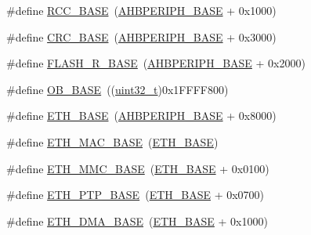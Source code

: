 \begin{DoxyCompactItemize}
\#define \hyperlink{group___peripheral__memory__map_ga0e681b03f364532055d88f63fec0d99d}{R\+C\+C\+\_\+\+B\+A\+SE}~(\hyperlink{openmotestm_2library_2inc_2stm32f10x__map_8h_a92eb5d49730765d2abd0f5b09548f9f5}{A\+H\+B\+P\+E\+R\+I\+P\+H\+\_\+\+B\+A\+SE} + 0x1000)
\item 
\#define \hyperlink{group___peripheral__memory__map_ga656a447589e785594cbf2f45c835ad7e}{C\+R\+C\+\_\+\+B\+A\+SE}~(\hyperlink{openmotestm_2library_2inc_2stm32f10x__map_8h_a92eb5d49730765d2abd0f5b09548f9f5}{A\+H\+B\+P\+E\+R\+I\+P\+H\+\_\+\+B\+A\+SE} + 0x3000)
\item 
\#define \hyperlink{group___peripheral__memory__map_ga8e21f4845015730c5731763169ec0e9b}{F\+L\+A\+S\+H\+\_\+\+R\+\_\+\+B\+A\+SE}~(\hyperlink{openmotestm_2library_2inc_2stm32f10x__map_8h_a92eb5d49730765d2abd0f5b09548f9f5}{A\+H\+B\+P\+E\+R\+I\+P\+H\+\_\+\+B\+A\+SE} + 0x2000)
\item 
\#define \hyperlink{group___peripheral__memory__map_gab5b5fb155f9ee15dfb6d757da1adc926}{O\+B\+\_\+\+B\+A\+SE}~((\hyperlink{_p_e___types_8h_a33594304e786b158f3fb30289278f5af}{uint32\+\_\+t})0x1\+F\+F\+F\+F800)
\item 
\#define \hyperlink{group___peripheral__memory__map_gad965a7b1106ece575ed3da10c45c65cc}{E\+T\+H\+\_\+\+B\+A\+SE}~(\hyperlink{openmotestm_2library_2inc_2stm32f10x__map_8h_a92eb5d49730765d2abd0f5b09548f9f5}{A\+H\+B\+P\+E\+R\+I\+P\+H\+\_\+\+B\+A\+SE} + 0x8000)
\item 
\#define \hyperlink{group___peripheral__memory__map_ga3cf7005808feb61bff1fee01e50a711a}{E\+T\+H\+\_\+\+M\+A\+C\+\_\+\+B\+A\+SE}~(\hyperlink{group___peripheral__memory__map_gad965a7b1106ece575ed3da10c45c65cc}{E\+T\+H\+\_\+\+B\+A\+SE})
\item 
\#define \hyperlink{group___peripheral__memory__map_ga4946f2b3b03f7998343ac1778fbcf725}{E\+T\+H\+\_\+\+M\+M\+C\+\_\+\+B\+A\+SE}~(\hyperlink{group___peripheral__memory__map_gad965a7b1106ece575ed3da10c45c65cc}{E\+T\+H\+\_\+\+B\+A\+SE} + 0x0100)
\item 
\#define \hyperlink{group___peripheral__memory__map_gaa0f60b922aeb7275c785cbaa8f94ecf0}{E\+T\+H\+\_\+\+P\+T\+P\+\_\+\+B\+A\+SE}~(\hyperlink{group___peripheral__memory__map_gad965a7b1106ece575ed3da10c45c65cc}{E\+T\+H\+\_\+\+B\+A\+SE} + 0x0700)
\item 
\#define \hyperlink{group___peripheral__memory__map_gace2114e1b37c1ba88d60f3e831b67e93}{E\+T\+H\+\_\+\+D\+M\+A\+\_\+\+B\+A\+SE}~(\hyperlink{group___peripheral__memory__map_gad965a7b1106ece575ed3da10c45c65cc}{E\+T\+H\+\_\+\+B\+A\+SE} + 0x1000)
\item 

\end{DoxyCompactItemize}
